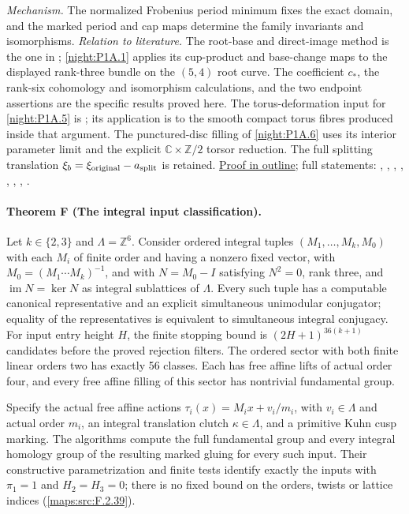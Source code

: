 \textit{Mechanism.} The normalized Frobenius period minimum fixes the exact domain, and the marked period and cap maps determine the family invariants and isomorphisms.
\textit{Relation to literature.}
The root-base and direct-image method is the one in
\cite[Lemmas~6.1--6.2 and Proposition~6.10]{DGKX2026v1};
\cref{night:P1A.1} applies its cup-product and base-change
maps to the displayed rank-three bundle on the $(5,4)$ root curve.
The coefficient $c_*$, the rank-six cohomology and
isomorphism calculations, and the two endpoint assertions are
the specific results proved here.  The torus-deformation input
for \cref{night:P1A.5} is \cite[Theorem~2.1, p.~264]{Catanese2004};
its application is to the smooth compact torus fibres produced
inside that argument.  The punctured-disc filling of
\cref{night:P1A.6} uses its interior parameter limit and
the explicit $\mathbb C\times\mathbb Z/2$ torsor reduction.
The full splitting translation
$\xi_b=\xi_{\rm original}-a_{\rm split}$ is retained.
\hyperlink{outline-V-E}{Proof in outline}; full statements: , , , , , , , .

\hypertarget{main-V-F}{}
\paragraph{Theorem F (The integral input classification).}
\label{series:V:F}
Let $k\in\{2,3\}$ and $\Lambda=\mathbb Z^6$.
Consider ordered integral tuples $(M_1,\ldots,M_k,M_0)$ with each
$M_i$ of finite order and having a nonzero fixed vector, with
$M_0=(M_1\cdots M_k)^{-1}$, and with
$N=M_0-I$ satisfying $N^2=0$, rank three, and
$\operatorname{im}N=\ker N$ as integral sublattices of $\Lambda$.
Every such tuple has a computable canonical representative and an
explicit simultaneous unimodular conjugator; equality of the
representatives is equivalent to simultaneous integral conjugacy.
For input entry height $H$, the finite stopping bound is
$(2H+1)^{36(k+1)}$ candidates before the proved rejection filters.
The ordered sector with both finite linear orders two has exactly
56 classes.  Each has free affine lifts of actual order four,
and every free affine filling of this sector has nontrivial
fundamental group.

Specify the actual free affine actions
$\tau_i(x)=M_ix+v_i/m_i$, with $v_i\in\Lambda$ and actual
order $m_i$, an integral translation clutch $\kappa\in\Lambda$,
and a primitive Kuhn cusp marking.  The algorithms compute the
full fundamental group and every integral homology group of the
resulting marked gluing for every such input.  Their constructive
parametrization and finite tests identify exactly the inputs with
$\pi_1=1$ and $H_2=H_3=0$; there is no fixed bound on the
orders, twists or lattice indices (\cref{maps:src:F.2.39}).

